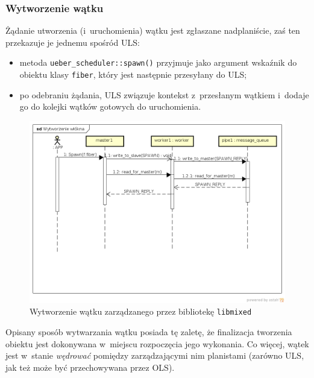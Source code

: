 \documentclass[12pt,makeidx]{mwart}
\newcommand{\code}{\texttt}
\newcommand{\dcolon}{::}
\newcommand{\procbr}{()}
\begin{document}
\subsubsection{Wytworzenie wątku}
\indent
	Żądanie utworzenia (i~uruchomienia) wątku jest zgłaszane nad\dywiz planiście, zaś ten przekazuje je jednemu spośród ULS:
	\begin{itemize}
		\item metoda \code{ueber\_scheduler\dcolon spawn\procbr} przyjmuje jako argument wskaźnik do obiektu klasy \code{fiber}, który
			jest następnie przesyłany do ULS;
		\item po odebraniu żądania, ULS związuje kontekst z~przesłanym wątkiem i~dodaje go do kolejki wątków gotowych do uruchomienia.
	\end{itemize}
	\begin{figure}[h!]
		\label{fig:threadcreation}
		\centering
		\hspace*{-1cm}\includegraphics[scale=.55]{ThreadCreation.png}
		\caption{Wytworzenie wątku zarządzanego przez bibliotekę \code{libmixed}}
	\end{figure}
	Opisany sposób wytwarzania wątku posiada tę zaletę, że finalizacja tworzenia obiektu jest dokonywana w~miejscu rozpoczęcia jego wykonania.
	Co więcej, wątek jest w~stanie \emph{wędrować} pomiędzy zarządzającymi nim planistami (zarówno ULS, jak też może być przechowywana przez
	OLS).
\par
%
\end{document}
